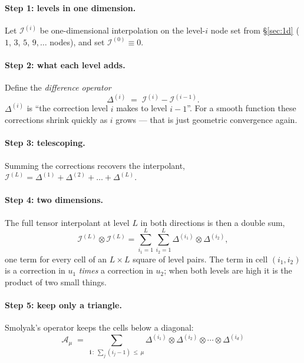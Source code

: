 \documentclass[10pt,a4paper]{article}
\theoremstyle{plain}
\theoremstyle{remark}
\begin{document}
\paragraph{Step 1: levels in one dimension.} Let $\mathcal{I}^{(i)}$ be one-dimensional
interpolation on the level-$i$ node set from \S\ref{sec:1d} ($1$, $3$, $5$, $9,\dots$ nodes),
and set $\mathcal{I}^{(0)}\equiv 0$.

\paragraph{Step 2: what each level adds.} Define the \emph{difference operator}
\begin{equation}
  \Delta^{(i)} \;=\; \mathcal{I}^{(i)} - \mathcal{I}^{(i-1)} .
\end{equation}
$\Delta^{(i)}$ is ``the correction level $i$ makes to level $i-1$''. For a smooth function
these corrections shrink quickly as $i$ grows --- that is just geometric convergence again.

\paragraph{Step 3: telescoping.} Summing the corrections recovers the interpolant,
$\mathcal{I}^{(L)} = \Delta^{(1)} + \Delta^{(2)} + \dots + \Delta^{(L)}$.

\paragraph{Step 4: two dimensions.} The full tensor interpolant at level $L$ in both
directions is then a double sum,
\begin{equation}
  \mathcal{I}^{(L)}\otimes\mathcal{I}^{(L)}
  = \sum_{i_1=1}^{L}\sum_{i_2=1}^{L}\Delta^{(i_1)}\otimes\Delta^{(i_2)},
\end{equation}
one term for every cell of an $L\times L$ square of level pairs. The term in cell
$(i_1,i_2)$ is a correction in $u_1$ \emph{times} a correction in $u_2$; when both levels are
high it is the product of two small things.

\paragraph{Step 5: keep only a triangle.} Smolyak's operator keeps the cells below a
diagonal:
\begin{equation}
  \boxed{\;\mathcal{A}_{\mu} \;=\; \sum_{\bm i\,:\;\sum_j (i_j-1)\,\le\,\mu}
  \Delta^{(i_1)}\otimes\Delta^{(i_2)}\otimes\cdots\otimes\Delta^{(i_d)}\;}
  \label{eq:smolyak}
\end{equation}
\end{document}
